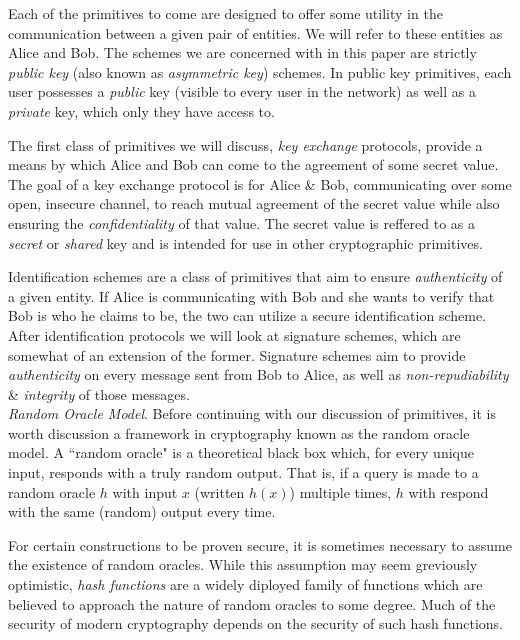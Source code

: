 Each of the primitives to come are designed to offer some utility in the communication between a given pair of entities. We will refer to these entities as Alice and Bob. The schemes we are concerned with in this paper are strictly \emph{public key} (also known as \emph{asymmetric key}) schemes. In public key primitives, each user possesses a \emph{public} key (visible to every user in the network) as well as a \emph{private} key, which only they have access to. 

The first class of primitives we will discuss, \emph{key exchange} protocols, provide a means by which Alice and Bob can come to the agreement of some secret value. The goal of a key exchange protocol is for Alice \& Bob, communicating over some open, insecure channel, to reach mutual agreement of the secret value while also ensuring the \emph{confidentiality} of that value. The secret value is reffered to as a \emph{secret} or \emph{shared} key and is intended for use in other cryptographic primitives. 

Identification schemes are a class of primitives that aim to ensure \emph{authenticity} of a given entity. If Alice is communicating with Bob and she wants to verify that Bob is who he claims to be, the two can utilize a secure identification scheme. After identification protocols we will look at signature schemes, which are somewhat of an extension of the former. Signature schemes aim to provide \emph{authenticity} on every message sent from Bob to Alice, as well as \emph{non-repudiability} \& \emph{integrity} of those messages.\\

\noindent
\emph{Random Oracle Model}. Before continuing with our discussion of primitives, it is worth discussion a framework in cryptography known as the random oracle model. A ``random oracle" is a theoretical black box which, for every unique input, responds with a truly random output. That is, if a query is made to a random oracle $h$ with input $x$ (written $h(x)$) multiple times, $h$ with respond with the same (random) output every time.

For certain constructions to be proven secure, it is sometimes necessary to assume the existence of random oracles. While this assumption may seem greviously optimistic, \emph{hash functions} are a widely diployed family of functions which are believed to approach the nature of random oracles to some degree. Much of the security of modern cryptography depends on the security of such hash functions.

